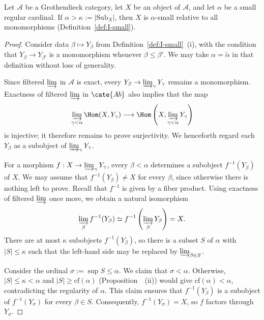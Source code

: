 \begin{lemma}\label{prop:alpha-small}
Let $\mathcal{A}$ be a Grothendieck category, let $X$ be an object of
$\mathcal{A}$, and let $\alpha$ be a small regular cardinal. If
$\alpha>\kappa:=|\mathrm{Sub}_X|$, then $X$ is $\alpha$-small relative to all
monomorphisms (Definition~\ref{def:I-small}).
\end{lemma}
\begin{proof}
Consider data $\beta\mapsto Y_\beta$ from
Definition~\ref{def:I-small}~(i), with the condition that
$Y_\beta\to Y_{\beta'}$ is a monomorphism whenever $\beta\leq\beta'$. We may
take $\alpha=\widetilde{\alpha}$ in that definition without loss of
generality.

Since filtered $\varinjlim$ in $\mathcal{A}$ is exact, every
$Y_\beta\to\varinjlim_\gamma Y_\gamma$ remains a monomorphism. Exactness of
filtered $\varinjlim$ in $\cate{Ab}$ also implies that the map
\[
\varinjlim_{\gamma<\alpha}\Hom(X,Y_\gamma)
\longrightarrow\Hom\left(X,\varinjlim_{\gamma<\alpha}Y_\gamma\right)
\]
is injective; it therefore remains to prove surjectivity. We henceforth regard
each $Y_\beta$ as a subobject of $\varinjlim_\gamma Y_\gamma$.

For a morphism $f:X\to\varinjlim_\gamma Y_\gamma$, every $\beta<\alpha$
determines a subobject $f^{-1}(Y_\beta)$ of $X$. We may assume that
$f^{-1}(Y_\beta)\neq X$ for every $\beta$, since otherwise there is nothing
left to prove. Recall that $f^{-1}$ is given by a fiber product. Using
exactness of filtered $\varinjlim$ once more, we obtain a natural isomorphism
\[\varinjlim_\beta f^{-1}(Y_\beta)
\simeq f^{-1}\left(\varinjlim_\beta Y_\beta\right)=X.\]
There are at most $\kappa$ subobjects $f^{-1}(Y_\beta)$, so there is a subset
$S$ of $\alpha$ with $|S|\leq\kappa$ such that the left-hand side may be
replaced by $\varinjlim_{\beta\in S}$.

Consider the ordinal $\sigma:=\sup S\leq\alpha$. We claim that
$\sigma<\alpha$. Otherwise, $|S|\leq\kappa<\alpha$ and
$|S|\geq\mathrm{cf}(\alpha)$
(Proposition~~(ii)) would give
$\mathrm{cf}(\alpha)<\alpha$, contradicting the regularity of $\alpha$.
This claim ensures that $f^{-1}(Y_\beta)$ is a subobject of
$f^{-1}(Y_\sigma)$ for every $\beta\in S$. Consequently,
$f^{-1}(Y_\sigma)=X$, so $f$ factors through $Y_\sigma$.
\end{proof}

